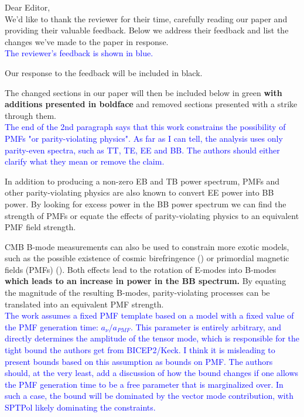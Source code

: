 \documentclass{article}
\begin{document}
Dear Editor,
\\

We'd like to thank the reviewer for their time, carefully reading our paper and providing their valuable feedback. Below we address their feedback and list the changes we've made to the paper in response.
\\

\textcolor{blue}{The reviewer's feedback is shown in blue.}

Our response to the feedback will be included in black. 

\textcolor{PineGreen}{The changed sections in our paper will then be included below in green \textbf{with additions presented in boldface} and removed sections presented with a strike through them.}
\\

\textcolor{blue}{The end of the 2nd paragraph says that this work constrains the possibility of PMFs "or parity-violating physics". As far as I can tell, the analysis uses only parity-even spectra, such as TT, TE, EE and BB. The authors should either clarify what they mean or remove the claim.}

In addition to producing a non-zero EB and TB power spectrum, PMFs and other parity-violating physics are also known to convert EE power into BB power. By looking for excess power in the BB power spectrum we can find the strength of PMFs or equate the effects of parity-violating physics to an equivalent PMF field strength.

\textcolor{PineGreen}{CMB B-mode measurements can also be used to constrain more exotic models, such as the possible existence of cosmic birefringence (\citep{carroll98,lue99}) or primordial magnetic fields (PMFs) (\citep{kosowsky96, seshadri01}).  
Both effects lead to the rotation of E-modes into B-modes \textbf{which leads to an increase in power in the BB spectrum.}
 By equating the magnitude of the resulting B-modes, parity-violating processes can be translated into an equivalent PMF strength.  }
\\

\textcolor{blue}{The work assumes a fixed PMF template based on a model with a fixed value of the PMF generation time: $a_{\nu}/a_{PMF}$. This parameter is entirely arbitrary, and directly determines the amplitude of the tensor mode, which is responsible for the tight bound the authors get from BICEP2/Keck. I think it is misleading to present bounds based on this assumption as bounds on PMF. The authors should, at the very least, add a discussion of how the bound changes if one allows the PMF generation time to be a free parameter that is marginalized over. In such a case, the bound will be dominated by the vector mode contribution, with SPTPol likely dominating the constraints.}
\end{document}
